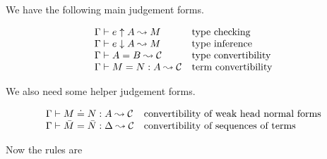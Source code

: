 We have the following main judgement forms.

\[\begin{array}{ll}
    {\Gamma} \vdash {e} \uparrow {A} \leadsto {M} & \mbox{type checking} \\
    {\Gamma} \vdash {e} \downarrow {A} \leadsto {M} & \mbox{type inference} \\
    {\Gamma} \vdash {A} = {B} \leadsto {\mathcal{C}} & \mbox{type convertibility} \\
    {\Gamma} \vdash {M} = {N} : {A} \leadsto {\mathcal{C}} & \mbox{term convertibility} \\
\end{array}\]

We also need some helper judgement forms.

\[\begin{array}{ll}
    {\Gamma} \vdash {M} \doteq {N} : {A} \leadsto {\mathcal{C}} & \mbox{convertibility of weak head normal forms} \\
    {\Gamma} \vdash {\bar M} = {\bar N} : {\Delta} \leadsto {\mathcal{C}} & \mbox{convertibility of sequences of terms} \\
\end{array}\]

Now the rules are




